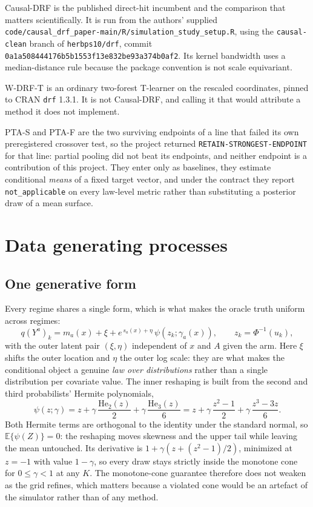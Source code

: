 \documentclass[11pt,a4paper]{article}
\theoremstyle{definition}
\theoremstyle{remark}
\newcommand{\Exp}{\mathbb{E}}
\begin{document}
Causal-DRF is the published direct-hit incumbent and the comparison that matters
scientifically. It is run from the authors' supplied
\texttt{code/causal\_drf\_paper-main/R/simulation\_study\_setup.R}, using the
\texttt{causal-clean} branch of \texttt{herbps10/drf}, commit
\texttt{0a1a508444176b5b1553f13e832be93a374b0af2}. Its kernel bandwidth uses a
median-distance rule because the package convention is not scale equivariant.

W-DRF-T is an ordinary two-forest T-learner on the rescaled coordinates, pinned
to CRAN \texttt{drf} 1.3.1. It is not Causal-DRF, and calling it that would
attribute a method it does not implement.

PTA-S and PTA-F are the two surviving endpoints of a line that failed its own
preregistered crossover test, so the project returned
\texttt{RETAIN-STRONGEST-ENDPOINT} for that line: partial pooling did not beat
its endpoints, and neither endpoint is a contribution of this project. They enter
only as baselines, they estimate conditional \emph{means} of a fixed target
vector, and under the contract they report \texttt{not\_applicable} on every
law-level metric rather than substituting a posterior draw of a mean surface.

\section{Data generating processes}

\subsection{One generative form}

Every regime shares a single form, which is what makes the oracle truth uniform
across regimes:
\begin{equation}
q(Y^a)_k = m_a(x) + \xi + e^{\,s_a(x) + \eta}\,\psi(z_k;\gamma_a(x)),
\qquad z_k = \Phi^{-1}(u_k),
\label{eq:dgp}
\end{equation}
with the outer latent pair $(\xi, \eta)$ independent of $x$ and $A$ given the
arm. Here $\xi$ shifts the outer location and $\eta$ the outer log scale: they
are what makes the conditional object a genuine \emph{law over distributions}
rather than a single distribution per covariate value. The inner reshaping is
built from the second and third probabilists' Hermite polynomials,
\[
\psi(z;\gamma) = z + \gamma\,\frac{\mathrm{He}_2(z)}{2} + \gamma\,\frac{\mathrm{He}_3(z)}{6}
= z + \gamma\,\frac{z^2 - 1}{2} + \gamma\,\frac{z^3 - 3z}{6}.
\]
Both Hermite terms are orthogonal to the identity under the standard normal, so
$\Exp\{\psi(Z)\} = 0$: the reshaping moves skewness and the upper tail while
leaving the mean untouched. Its derivative is
$1 + \gamma(z + (z^2-1)/2)$, minimized at $z = -1$ with value $1 - \gamma$, so
every draw stays strictly inside the monotone cone for $0 \leq \gamma < 1$ at any
$K$. The monotone-cone guarantee therefore does not weaken as the grid refines,
which matters because a violated cone would be an artefact of the simulator
rather than of any method.
\end{document}
